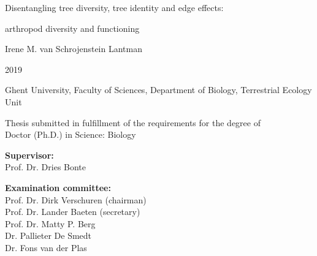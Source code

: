 \documentclass[b5paper,10pt]{book} %
\begin{document}
	
	\newpage{\thispagestyle{empty}\cleardoublepage}
	\color{black}
	\newpage 
	\thispagestyle{empty}
\begin{center}
			\thispagestyle{empty}
			
			\vspace*{3.00cm}
			
			{\Large Disentangling tree diversity, tree identity and edge effects:}

			\vspace{0.5 cm}

			{\Large arthropod diversity and functioning}
			
			\vspace{7.0 cm}
			
			{\normalsize Irene M. van Schrojenstein Lantman} 
			
			\vspace{1.0 cm}
			
			{\normalsize 2019}	
			
			\vspace{2.0 cm}
			
			{\footnotesize Ghent University, Faculty of Sciences, Department of Biology, Terrestrial Ecology Unit}
			
			\vspace{0.5cm}
			
			{\footnotesize Thesis submitted in fulfillment of the requirements for the degree of\\
 			Doctor (Ph.D.) in Science: Biology}

\end{center}
\newpage
		
	\color{black}
	\newpage 
	\thispagestyle{empty}

		
	{\small \textbf{Supervisor:} \\
			\hspace{10mm}Prof. Dr. Dries Bonte}

	\vspace*{1.0cm}
	
	{\small \textbf{Examination committee:}\\
		\hspace{10mm} Prof. Dr. Dirk Verschuren (chairman) \\
		\hspace{10mm}Prof. Dr. Lander Baeten (secretary) \\
		\hspace{10mm}Prof. Dr. Matty P. Berg \\
		\hspace{10mm} Dr. Pallieter De Smedt \\
		\hspace{10mm} Dr. Fons van der Plas} \\
\end{document}
